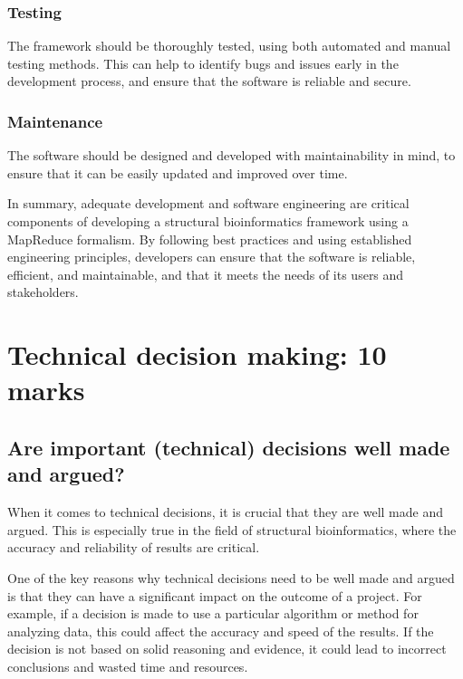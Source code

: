 \documentclass[]{final_report}
\begin{document}
\subsubsection{Testing}

The framework should be thoroughly tested, using both automated and manual testing methods. This can help to identify bugs and issues early in the development process, and ensure that the software is reliable and secure.

\subsubsection{Maintenance}

The software should be designed and developed with maintainability in mind, to ensure that it can be easily updated and improved over time.








In summary, adequate development and software engineering are critical components of developing a structural bioinformatics framework using a MapReduce formalism. By following best practices and using established engineering principles, developers can ensure that the software is reliable, efficient, and maintainable, and that it meets the needs of its users and stakeholders.

\section{Technical decision making: 10 marks}
\subsection{Are important (technical) decisions well made and argued?}
When it comes to technical decisions, it is crucial that they are well made and argued. This is especially true in the field of structural bioinformatics, where the accuracy and reliability of results are critical.

One of the key reasons why technical decisions need to be well made and argued is that they can have a significant impact on the outcome of a project. For example, if a decision is made to use a particular algorithm or method for analyzing data, this could affect the accuracy and speed of the results. If the decision is not based on solid reasoning and evidence, it could lead to incorrect conclusions and wasted time and resources.
\end{document}
